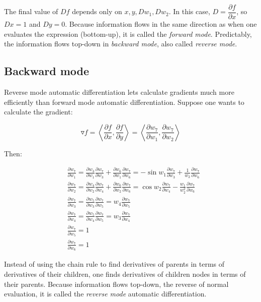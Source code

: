 \documentclass{pracamgr}
\numberwithin{equation}{section}
\begin{document}
The final value of $Df$ depends only on $x, y, Dw_{1}, Dw_{2}$. In this case, $ D = \dfrac{\partial f}{\partial x}$, so $Dx = 1$ and $Dy = 0$. Because information flows in the same direction as when one evaluates the expression (bottom-up), it is called the \textit{forward mode}. Predictably, the information flows top-down in  \textit{backward mode}, also called \textit{reverse mode}.

\subsection{Backward mode}

Reverse mode automatic differentiation lets calculate gradients much more efficiently than forward mode automatic differentiation. Suppose one wants to calculate the gradient:

\[ \triangledown f = \left<\frac{\partial f}{\partial x}, \frac{\partial f}{\partial y}\right> = \left<\frac{\partial w_{7}}{\partial w_{1}}, \frac{\partial w_{7}}{\partial w_{2}}\right> \]

Then:

\begin{align*}
& \frac{\partial w_{7}}{\partial w_{1}} = \frac{\partial w_{3}}{\partial w_{1}} \frac{\partial w_{7}}{\partial w_{3}} + \frac{\partial w_{6}}{\partial w_{1}} \frac{\partial w_{7}}{\partial w_{6}} = -\sin w_{1} \frac{\partial w_{7}}{\partial w_{3}} + \frac{1}{w_{2}} \frac{\partial w_{7}}{\partial w_{6}} \\
& \frac{\partial w_{7}}{\partial w_{2}} = \frac{\partial w_{4}}{\partial w_{2}} \frac{\partial w_{7}}{\partial w_{4}} + \frac{\partial w_{6}}{\partial w_{2}} \frac{\partial w_{7}}{\partial w_{6}} = \cos w_{2} \frac{\partial w_{7}}{\partial w_{4}} - \frac{w_{1}}{w_{2}^{2}} \frac{\partial w_{7}}{\partial w_{6}} \\
& \frac{\partial w_{7}}{\partial w_{3}} = \frac{\partial w_{5}}{\partial w_{3}} \frac{\partial w_{7}}{\partial w_{5}} = w_{4} \frac{\partial w_{7}}{\partial w_{5}} \\
& \frac{\partial w_{7}}{\partial w_{4}} = \frac{\partial w_{5}}{\partial w_{4}} \frac{\partial w_{7}}{\partial w_{5}} = w_{3} \frac{\partial w_{7}}{\partial w_{4}} \\
& \frac{\partial w_{7}}{\partial w_{5}} = 1 \\
& \frac{\partial w_{7}}{\partial w_{6}} = 1
\end{align*}

Instead of using the chain rule to find derivatives of parents in terms of derivatives of their children, one finds derivatives of children nodes in terms of their parents. Because information flows top-down, the reverse of normal evaluation, it is called the \textit{reverse mode} automatic differentiation.
\end{document}
